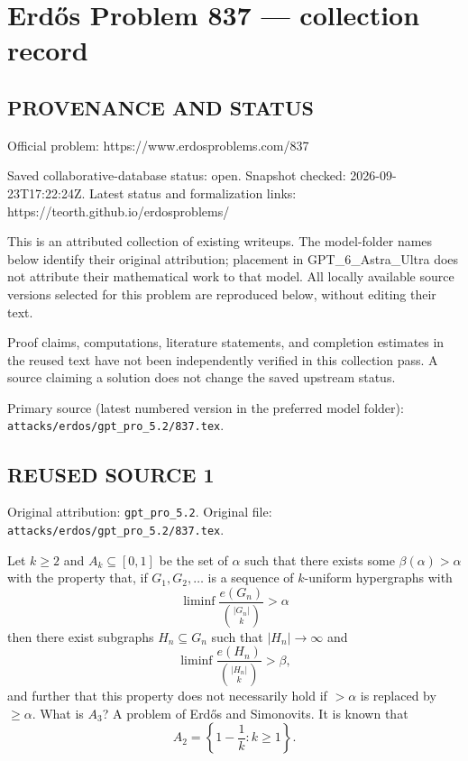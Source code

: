 \section*{Erd\H{o}s Problem 837 --- collection record}

\subsection*{PROVENANCE AND STATUS}
Official problem: https://www.erdosproblems.com/837

Saved collaborative-database status: open.
Snapshot checked: 2026-09-23T17:22:24Z.
Latest status and formalization links: https://teorth.github.io/erdosproblems/

This is an attributed collection of existing writeups. The model-folder names below identify their original attribution; placement in GPT\_6\_Astra\_Ultra does not attribute their mathematical work to that model. All locally available source versions selected for this problem are reproduced below, without editing their text.

Proof claims, computations, literature statements, and completion estimates in the reused text have not been independently verified in this collection pass. A source claiming a solution does not change the saved upstream status.

Primary source (latest numbered version in the preferred model folder): \texttt{attacks/erdos/gpt\_pro\_5.2/837.tex}.

\subsection*{REUSED SOURCE 1}
Original attribution: \texttt{gpt\_pro\_5.2}.
Original file: \texttt{attacks/erdos/gpt\_pro\_5.2/837.tex}.


Let $k\geq 2$ and $A_k\subseteq [0,1]$ be the set of $\alpha$ such that there exists some $\beta(\alpha)>\alpha$ with the property that, if $G_1,G_2,\ldots$ is a sequence of $k$-uniform hypergraphs with\[\liminf \frac{e(G_n)}{\binom{\lvert G_n\rvert}{k}} >\alpha\]then there exist subgraphs $H_n\subseteq G_n$ such that $\lvert H_n\rvert \to \infty$ and\[\liminf \frac{e(H_n)}{\binom{\lvert H_n\rvert}{k}} >\beta,\]and further that this property does not necessarily hold if $>\alpha$ is replaced by $\geq \alpha$. What is $A_3$? A problem of Erd\H{o}s and Simonovits. It is known that\[A_2 = \left\{ 1-\frac{1}{k} : k\geq 1\right\}.\]

